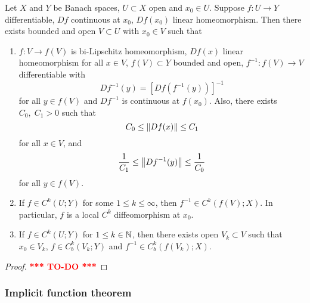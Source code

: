 \documentclass[a4paper]{article}
\newcommand{\TODO}{\textcolor{red}{\textbf{*** TO-DO ***}}}
\begin{document}
\begin{thm}
  Let $X$ and $Y$ be Banach spaces, $U \subset X$ open and
  $x_0 \in U$. Suppose $f: U \to Y$ differentiable,
  $Df$ continuous at $x_0$, $Df(x_0)$ linear homeomorphism.
  Then there exists bounded and open $V \subset U$ with
  $x_0 \in V$ such that
  \begin{enumerate}
    \item $f: V \to f(V)$ is bi-Lipschitz homeomorphism,
    $Df(x)$ linear homeomorphism for all $x \in V$,
    $f(V) \subset Y$ bounded and open, $f^{-1} : f(V) \to V$
    differentiable with
    \[
    Df^{-1}(y) = [Df(f^{-1}(y))]^{-1}
    \]
    for all $y \in f(V)$ and $Df^{-1}$ is continuous
    at $f(x_0)$. Also, there exists $C_0, \; C_1 > 0$
    such that
    \[
    C_0 \leq \left\lVert Df(x)\right\rVert \leq C_1
    \]
    for all $x \in V$, and
    \[
    \frac{1}{C_1} \leq \left\lVert Df^{-1}(y)\right\rVert \leq \frac{1}{C_0}
    \]
    for all $y \in f(V)$.
    \item If $f \in C^k(U; Y)$ for some $1 \leq k \leq \infty$,
    then $f^{-1} \in C^k(f(V); X)$. In particular,
    $f$ is a local $C^k$ diffeomorphism at $x_0$.
    \item If $f \in C^k(U; Y)$ for $1 \leq k \in \mathbb{N}$, then
    there exists open $V_k \subset V$ such that $x_0 \in V_k$,
    $f \in C^k_b(V_k ; Y)$ and $f^{-1} \in C^k_b(f(V_k) ; X)$.
  \end{enumerate}
\end{thm}

\begin{proof}
  \TODO
\end{proof}

\subsubsection{Implicit function theorem}
\end{document}

